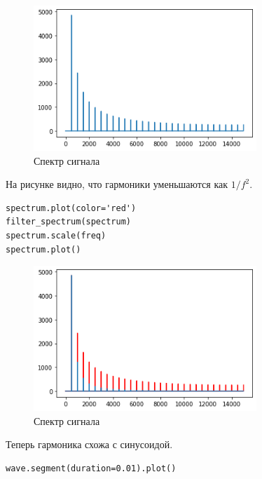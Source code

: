\documentclass[a4paper,12pt]{report}
\begin{document}
\begin{figure}[H]
        \centering
        \includegraphics[width=0.75\textwidth]{7.png}
        \caption{Спектр сигнала}
        \label{fig:fig6_1}
\end{figure}

На рисунке видно, что гармоники уменьшаются как \(1 / f^2\).

\begin{lstlisting}[caption=Сравнение гармоник]
spectrum.plot(color='red')
filter_spectrum(spectrum)
spectrum.scale(freq)
spectrum.plot()
\end{lstlisting}

\begin{figure}[H]
        \centering
        \includegraphics[width=0.75\textwidth]{8.png}
        \caption{Спектр сигнала}
        \label{fig:fig6_2}
\end{figure}

Теперь гармоника схожа с синусоидой.

\begin{lstlisting}[caption=Сегмент звука]
wave.segment(duration=0.01).plot()
\end{lstlisting}
\end{document}
